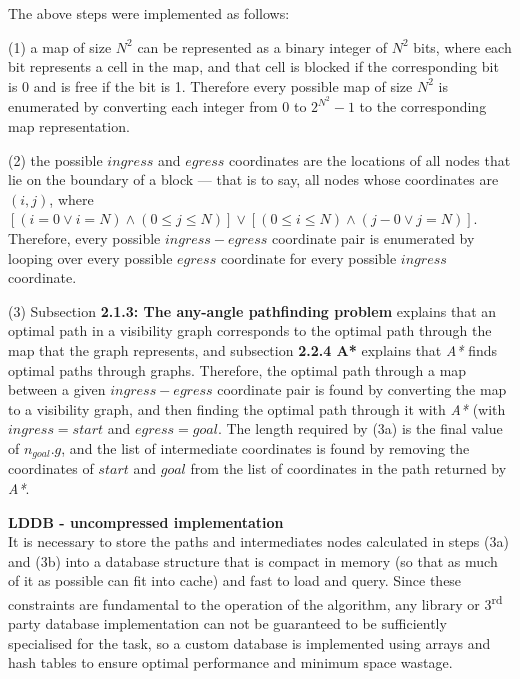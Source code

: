 \documentclass[12pt,notitlepage]{report}
\begin{document}
\noindent
The above steps were implemented as follows:
\begin{description}
\item (1) a map of size $N^{2}$ can be represented as a binary integer of $N^{2}$ bits, where each bit represents a cell in the map, and that cell is blocked if the corresponding bit is 0 and is free if the bit is 1. Therefore every possible map of size $N^{2}$ is enumerated by converting each integer from $0$ to $2^{N^{2}}-1$ to the corresponding map representation.
\item (2) the possible $ingress$ and $egress$ coordinates are the locations of all nodes that lie on the boundary of a block --- that is to say, all nodes whose coordinates are $(i,j)$, where $[(i=0 \lor i=N) \land (0\leq j \leq N)] \lor [(0\leq i \leq N) \land (j-0 \lor j=N)]$. Therefore, every possible $ingress-egress$ coordinate pair is enumerated by looping over every possible $egress$ coordinate for every possible $ingress$ coordinate.
\item (3) Subsection {\bfseries 2.1.3: The any-angle pathfinding problem} explains that an optimal path in a visibility graph corresponds to the optimal path through the map that the graph represents, and subsection {\bfseries 2.2.4 A*} explains that {\em A*} finds optimal paths through graphs. Therefore, the optimal path through a map between a given $ingress-egress$ coordinate pair is found by converting the map to a visibility graph, and then finding the optimal path through it with {\em A*} (with $ingress = start$ and $egress=goal$. The length required by (3a) is the final value of $n_{goal}.g$, and the list of intermediate coordinates is found by removing the coordinates of $start$ and $goal$ from the list of coordinates in the path returned by {\em A*}.
\end{description}

\noindent
{\bfseries LDDB - uncompressed implementation}\\
\noindent
It is necessary to store the paths and intermediates nodes calculated in steps (3a) and (3b) into a database structure that is compact in memory (so that as much of it as possible can fit into cache) and fast to load and query. Since these constraints are fundamental to the operation of the algorithm, any library or 3\textsuperscript{rd} party database implementation can not be guaranteed to be sufficiently specialised for the task, so a custom database is implemented using arrays and hash tables to ensure optimal performance and minimum space wastage.\\
\end{document}
